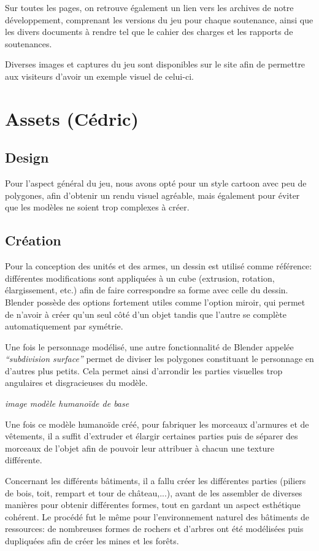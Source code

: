 \documentclass[12pt]{report}
\begin{document}
Sur toutes les pages, on retrouve également un lien vers les archives de notre
développement, comprenant les versions du jeu pour chaque soutenance, ainsi que les
divers documents à rendre tel que le cahier des charges et les rapports de
soutenances.

Diverses images et captures du jeu sont disponibles sur le site afin de
permettre aux visiteurs d’avoir un exemple visuel de celui-ci.

\section{Assets (Cédric)}

\subsection{Design}

Pour l’aspect général du jeu, nous avons opté pour un style cartoon avec peu de 
polygones, afin d’obtenir un rendu visuel agréable, mais également pour éviter 
que les modèles ne soient trop complexes à créer. 

\subsection{Création}

Pour la conception des unités et des armes, un dessin est utilisé comme référence: 
différentes modifications sont appliquées à un cube (extrusion, rotation, élargissement, 
etc.) afin de faire correspondre sa forme avec celle du dessin. Blender possède des 
options fortement utiles comme l’option miroir, qui permet de n’avoir à créer qu’un seul 
côté d’un objet tandis que l’autre se complète automatiquement par symétrie.

Une fois le personnage modélisé, une autre fonctionnalité de Blender appelée 
\textit{“subdivision surface”} permet de diviser les polygones constituant le personnage 
en d’autres plus petits. Cela permet ainsi d’arrondir les parties visuelles trop angulaires 
et disgracieuses du modèle.

\textit{image modèle humanoïde de base}

Une fois ce modèle humanoïde créé, pour fabriquer les morceaux d’armures et de 
vêtements, il a suffit d’extruder et élargir certaines parties puis de séparer des 
morceaux de l’objet afin de pouvoir leur attribuer à chacun une texture différente. 

Concernant les différents bâtiments, il a fallu créer les différentes parties (piliers 
de bois, toit, rempart et tour de château,...), avant de les assembler de diverses 
manières pour obtenir différentes formes, tout en gardant un aspect esthétique 
cohérent. Le procédé fut le même pour l’environnement naturel des bâtiments de 
ressources: de nombreuses formes de rochers et d’arbres ont été modélisées puis 
dupliquées afin de créer les mines et les forêts.
\end{document}
